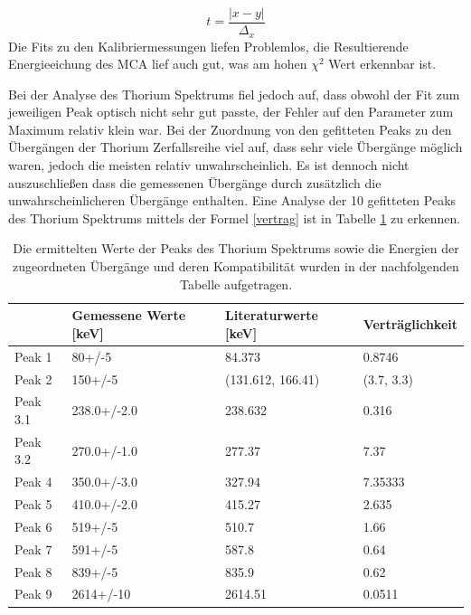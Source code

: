 \begin{equation}
t = \frac{\left|x-y\right|}{\Delta_x}
\label{vertrag}
\end{equation}
Die Fits zu den Kalibriermessungen liefen Problemlos, die Resultierende Energieeichung des MCA lief auch gut, was am hohen $\chi^2$ Wert erkennbar ist.\par
Bei der Analyse des Thorium Spektrums fiel jedoch auf, dass obwohl der Fit zum jeweiligen Peak optisch nicht sehr gut passte, der Fehler auf den Parameter zum Maximum relativ klein war.
Bei der Zuordnung von den gefitteten Peaks zu den Übergängen der Thorium Zerfallsreihe viel auf, dass sehr viele Übergänge möglich waren, jedoch die meisten relativ unwahrscheinlich. Es ist dennoch nicht auszuschließen dass die gemessenen Übergänge durch zusätzlich die unwahrscheinlicheren Übergänge enthalten. Eine Analyse der 10 gefitteten Peaks des Thorium Spektrums mittels der Formel \ref{vertrag} ist in Tabelle \ref{Ergebnisse} zu erkennen.
\begin{table}
	\caption[Ergebnisse des Thorium Spektrums]{Die ermittelten Werte der Peaks des Thorium Spektrums sowie die Energien der zugeordneten Übergänge und deren Kompatibilität wurden in der nachfolgenden Tabelle aufgetragen.}
	\begin{tabular}{llll}
		\toprule
		{} & Gemessene Werte [keV] & Literaturwerte [keV] &                         Verträglichkeit \\
		\midrule
		Peak 1   &                80+/-5 &               84.373 &                                  0.8746 \\
		Peak 2   &               150+/-5 &    (131.612, 166.41) &  (3.7, 3.3) \\
		Peak 3.1 &           238.0+/-2.0 &              238.632 &                                   0.316 \\
		Peak 3.2 &           270.0+/-1.0 &               277.37 &                                    7.37 \\
		Peak 4   &           350.0+/-3.0 &               327.94 &                                 7.35333 \\
		Peak 5   &           410.0+/-2.0 &               415.27 &                                   2.635 \\
		Peak 6   &               519+/-5 &                510.7 &                                    1.66 \\
		Peak 7   &               591+/-5 &                587.8 &                                    0.64 \\
		Peak 8   &               839+/-5 &                835.9 &                                    0.62 \\
		Peak 9   &             2614+/-10 &              2614.51 &                                  0.0511 \\
		\bottomrule
	\end{tabular}
\label{Ergebnisse}
\end{table}
